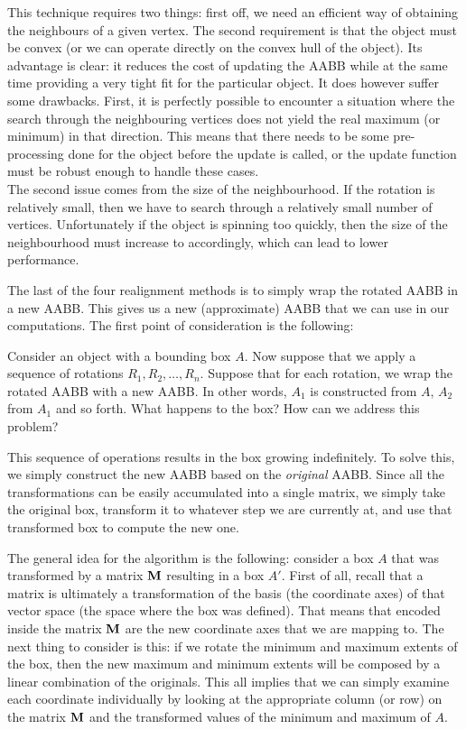     This technique requires two things: first off, we need an efficient way of
    obtaining the neighbours of a given vertex. The second requirement is that
    the object must be convex (or we can operate directly on the convex hull of
    the object). Its advantage is clear: it reduces the cost of updating the
    AABB while at the same time providing a very tight fit for the particular
    object. It does however suffer some drawbacks. First, it is perfectly
    possible to encounter a situation where the search through the neighbouring
    vertices does not yield the real maximum (or minimum) in that direction.
    This means that there needs to be some pre-processing done for the object
    before the update is called, or the update function must be robust enough to
    handle these cases.\\
    The second issue comes from the size of the neighbourhood. If the rotation
    is relatively small, then we have to search through a relatively small
    number of vertices. Unfortunately if the object is spinning too quickly,
    then the size of the neighbourhood must increase to accordingly, which can
    lead to lower performance.

    The last of the four realignment methods is to simply wrap the rotated
    AABB in a new AABB. This gives us a new (approximate) AABB that we can use
    in our computations. The first point of consideration is the following:
    \begin{case}
      Consider an object with a bounding box $A$. Now suppose that we apply a
      sequence of rotations $R_1, R_2, \ldots, R_n$. Suppose that for each
      rotation, we wrap the rotated AABB with a new AABB. In other words, $A_1$
      is constructed from $A$, $A_2$ from $A_1$ and so forth. What happens to
      the box? How can we address this problem?
    \end{case}

    This sequence of operations results in the box growing indefinitely. To
    solve this, we simply construct the new AABB based on the \emph{original}
    AABB. Since all the transformations can be easily accumulated into a single
    matrix, we simply take the original box, transform it to whatever step we
    are currently at, and use that transformed box to compute the new one.

    The general idea for the algorithm is the following: consider a box $A$ that
    was transformed by a matrix ${\mathbf M}$ resulting in a box $A'$. First of
    all, recall that a matrix is ultimately a transformation of the basis (the
    coordinate axes) of that vector space (the space where the box was defined).
    That means that encoded inside the matrix ${\mathbf M}$ are the new coordinate axes
    that we are mapping to. The next thing to consider is this: if we rotate the
    minimum and maximum extents of the box, then the new maximum and minimum
    extents will be composed by a linear combination of the originals. This all
    implies that we can simply examine each coordinate individually by looking
    at the appropriate column (or row) on the matrix ${\mathbf M}$ and the transformed
    values of the minimum and maximum of $A$.

